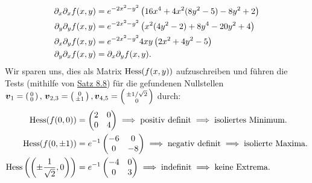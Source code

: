 \begin{Beispiel}
\begin{align*}
    \partial_x\partial_xf(x,y)&=e^{-2x^2-y^2}\left({16x^4+4x^2(8y^2-5)-8y^2+2}\right)\\
    \partial_y\partial_yf(x,y)&=e^{-2x^2-y^2}\left({x^2(4y^2-2)+8y^4-20y^2+4}\right)\\
    \partial_x\partial_yf(x,y)&=e^{-2x^2-y^2}4xy\left({2x^2+4y^2-5}\right)\\
    \partial_y\partial_xf(x,y)&=\partial_x\partial_yf(x,y).
\end{align*}
Wir sparen uns, dies als Matrix $\text{Hess}(f(x,y))$ aufzuschreiben und führen die Tests (mithilfe von \hyperref[satz:08DefinitheitEigenwerte]{Satz 8.8}) für die gefundenen Nullstellen ${{\text{\boldmath${v}$}}}_1=\left(\begin{smallmatrix}0\\0\end{smallmatrix}\right),\,{{\text{\boldmath${v}$}}}_{2,3}=\left(\begin{smallmatrix}0\\\pm1\end{smallmatrix}\right),{{\text{\boldmath${v}$}}}_{4,5}=\left(\begin{smallmatrix}\pm1/\sqrt{2}\\0\end{smallmatrix}\right)$ durch:
\begin{align*}
    \text{Hess}(f(0,0))&=\begin{pmatrix}2&0\\0&4\end{pmatrix}\implies \text{positiv definit}\implies \text{isoliertes Minimum.}\\
    \text{Hess}(f(0,\pm1))&=e^{-1}\begin{pmatrix}-6&0\\0&-8\end{pmatrix}\implies \text{negativ definit}\implies \text{isolierte Maxima.}\\
    \text{Hess}\left({\left({\pm\frac{1}{\sqrt{2}},0}\right)}\right)&=e^{-1}\begin{pmatrix}-4&0\\0&3\end{pmatrix}\implies \text{indefinit}\implies \text{keine Extrema.}
\end{align*}
\end{Beispiel}
